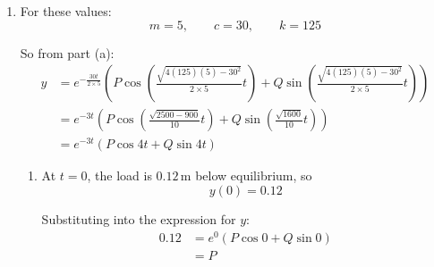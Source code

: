 \documentclass[leqno]{article}
\begin{document}
\begin{enumerate}[
  label=\textbf{\arabic*.},
  leftmargin=*,
  topsep=0pt,
  partopsep=0pt,
  parsep=0pt
]
\begin{djsSolution}
\begin{enumerate}[label=\textbf{(\alph*)}]
  Using Newton's second law:
  \[
  m\frac{\mathrm{d}^2y}{\mathrm{d}t^2}=-c\frac{\mathrm{d}y}{\mathrm{d}t}-ky
  \]

  So
  \[
  m\frac{\mathrm{d}^2y}{\mathrm{d}t^2}+c\frac{\mathrm{d}y}{\mathrm{d}t}+ky=0
  \]

  To solve this differential equation, use the auxiliary equation
  \[
  m\lambda^2+c\lambda+k=0
  \]

  Using the quadratic formula:
  \begin{align*}
  \lambda
  &=\frac{-c\pm\sqrt{c^2-4mk}}{2m} \\
  &=\frac{-c\pm\sqrt{-(4km-c^2)}}{2m}
  \end{align*}

  Since $4km>c^2$, we have
  \[
  \sqrt{-(4km-c^2)}=i\sqrt{4km-c^2}
  \]

  Hence the roots are
  \[
  \lambda=-\frac{c}{2m}\pm i\frac{\sqrt{4km-c^2}}{2m}
  \]

  For roots of the form $\alpha\pm i\beta$, the general solution is
  \[
  y=e^{\alpha t}\left(P\cos \beta t+Q\sin \beta t\right)
  \]

  Here
  \[
  \alpha=-\frac{c}{2m},
  \qquad
  \beta=\frac{\sqrt{4km-c^2}}{2m}
  \]

  Therefore
  \[
  y=e^{-\frac{ct}{2m}}\left(P\cos\left(\frac{\sqrt{4km-c^2}}{2m}t\right)+Q\sin\left(\frac{\sqrt{4km-c^2}}{2m}t\right)\right)
  \]

  This is the required form.

  \item For these values:
  \[
  m=5,\qquad c=30,\qquad k=125
  \]

  So from part (a):
  \begin{align*}
  y&=e^{-\frac{30t}{2\times 5}}\left(P\cos\left(\frac{\sqrt{4(125)(5)-30^2}}{2\times 5}t\right)+Q\sin\left(\frac{\sqrt{4(125)(5)-30^2}}{2\times 5}t\right)\right) \\
  &=e^{-3t}\left(P\cos\left(\frac{\sqrt{2500-900}}{10}t\right)+Q\sin\left(\frac{\sqrt{1600}}{10}t\right)\right) \\
  &=e^{-3t}\left(P\cos 4t+Q\sin 4t\right)
  \end{align*}

  \begin{enumerate}[label=(\roman*)]
    \item At $t=0$, the load is $0.12\,\mathrm{m}$ below equilibrium, so
    \[
    y(0)=0.12
    \]

    Substituting into the expression for $y$:
    \begin{align*}
    0.12
    &=e^0\left(P\cos 0+Q\sin 0\right) \\
    &=P
    \end{align*}


\end{enumerate}
\end{enumerate}
\end{djsSolution}
\end{enumerate}
\end{document}
